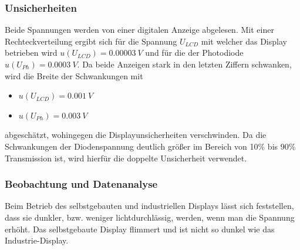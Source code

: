 \documentclass[
	a4paper,
	12pt,
	pagesize,
	ngerman
]{scrartcl}
\begin{document}
	\subsubsection{Unsicherheiten}
	Beide Spannungen werden von einer digitalen Anzeige abgelesen.
	Mit einer Rechteckverteilung ergibt sich für die Spannung $U_{LCD}$ mit welcher das Display betrieben wird $u(U_{LCD})=\SI{0.00003}{V}$ und für die der Photodiode $u(U_{Ph})=\SI{0.0003}{V}$.
	Da beide Anzeigen stark in den letzten Ziffern schwanken, wird die Breite der Schwankungen mit
	\begin{itemize}
		\item $u(U_{LCD})=\SI{0.001}{V}$
		\item $u(U_{Ph})=\SI{0.003}{V}$
	\end{itemize}
	abgeschätzt, wohingegen die Displayunsicherheiten verschwinden.
	Da die Schwankungen der Diodenspannung deutlich größer im Bereich von 10\% bis 90\% Transmission ist, wird hierfür die doppelte Unsicherheit verwendet.
	\subsubsection{Beobachtung und Datenanalyse}
	Beim Betrieb des selbstgebauten und industriellen Displays lässt sich feststellen, dass sie dunkler, bzw. weniger lichtdurchlässig, werden, wenn man die Spannung erhöht.
	Das selbstgebaute Display flimmert und ist nicht so dunkel wie das Industrie-Display.
\end{document}
